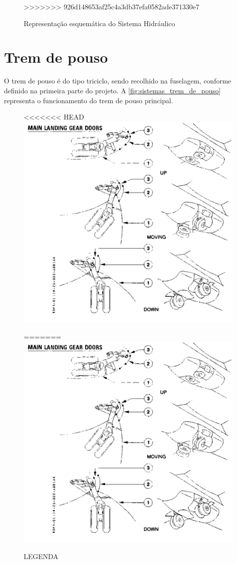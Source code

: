 \begin{figure}
\caption{Representação esquemática do Sistema Hidráulico}
>>>>>>> 926d148653af25c4a3db37efa0582ade371330e7
\label{fig:sistemas_hidraulico}
\end{figure}


\section{Trem de pouso}

O trem de pouso é do tipo triciclo, sendo recolhido na fuselagem, conforme definido na primeira parte do projeto.
A \autoref{fig:sistemas_trem_de_pouso} representa o funcionamento do trem de pouso principal.

\begin{figure}
<<<<<<< HEAD
\centering
\includegraphics{images/parte3/sistemas_trem_de_pouso.png}
\caption{LEGENDA}
=======
\includegraphics[width=\textwidth]{images/parte3/sistemas_trem_de_pouso.png}

\end{figure}
